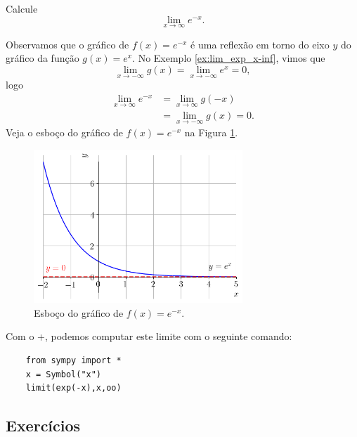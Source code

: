 \begin{exeresol}
  Calcule
  \begin{equation}
    \lim_{x\to \infty} e^{-x}.
  \end{equation}
\end{exeresol}
\begin{resol}
  Observamos que o gráfico de $f(x)=e^{-x}$ é uma reflexão em torno do eixo $y$ do gráfico da função $g(x)=e^x$. No Exemplo \ref{ex:lim_exp_x-inf}, vimos que
  \begin{equation}
    \lim_{x\to -\infty} g(x) = \lim_{x\to -\infty} e^{x} = 0,
  \end{equation}
  logo
  \begin{align}
    \lim_{x\to \infty} e^{-x} &= \lim_{x\to \infty} g(-x)\\
                              &= \lim_{x\to -\infty} g(x) = 0.
  \end{align}
  Veja o esboço do gráfico de $f(x)=e^{-x}$ na Figura \ref{fig:exeresol_lim_exp_xinf}.

  \begin{figure}[H]
    \centering
    \includegraphics[width=0.7\textwidth]{./cap_lim/dados/fig_exeresol_lim_exp_xinf/fig_exeresol_lim_exp_xinf}
    \caption{Esboço do gráfico de $f(x)=e^{-x}$.}
    \label{fig:exeresol_lim_exp_xinf}
  \end{figure}  

  \ifispython
  Com o {\python}+{\sympy}, podemos computar este limite com o seguinte comando:
  \begin{lstlisting}
    from sympy import *
    x = Symbol("x")
    limit(exp(-x),x,oo)
  \end{lstlisting}
  \fi
\end{resol}

\subsection*{Exercícios}

